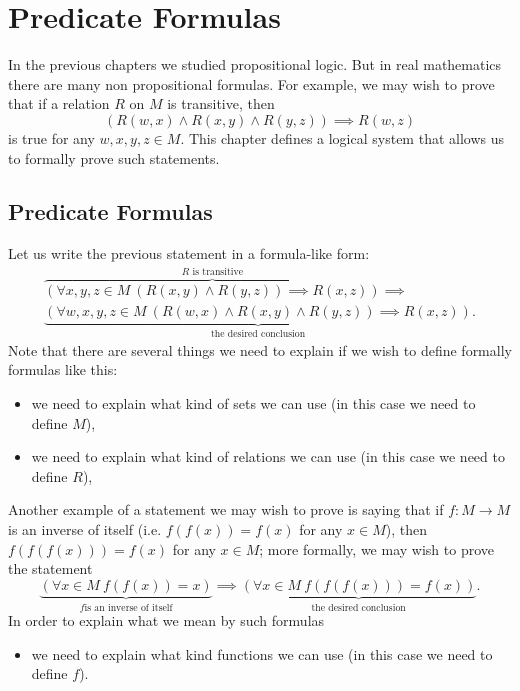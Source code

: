 \chapter{Predicate Formulas}
\label{chapter:predicate-formulas}
In the previous chapters we studied propositional logic. But in real mathematics
there are many non propositional formulas. For example, we may wish to prove
that if a relation $R$ on $M$ is transitive, then
\[
  (R(w, x) \land R(x, y) \land R(y, z)) \implies R(w, z)
\]
is true for any $w, x, y, z \in M$. This chapter defines a logical
system that allows us to formally prove such statements.

\section{Predicate Formulas}
Let us write the previous statement in a formula-like form:
\begin{multline*}
    \overbrace{
        \left(
          \forall x, y, z \in M ~ (R(x, y) \land R(y, z)) \implies R(x, z)
         \right)
    }^{R \text{ is transitive}} \implies \\
    \underbrace{(
        \forall w, x, y, z \in M ~ (R(w, x) \land R(x, y) \land R(y, z))
        \implies
        R(x, z)
    )}_\text{the desired conclusion}.
\end{multline*}
Note that there are several things we need to explain if we wish to define
formally formulas like this:
\begin{itemize}
    \item we need to explain what kind of sets we can use (in this case we need
        to define $M$),
    \item we need to explain what kind of relations we can use (in this case we
        need to define $R$),
\end{itemize}

Another example of a statement we may wish to prove is saying that if
$f : M \to M$ is an inverse of itself (i.e. $f(f(x)) = f(x)$ for any $x \in M$),
then $f(f(f(x))) = f(x)$ for any $x \in M$; more formally, we may wish to prove
the statement
\[
    \underbrace{
        (\forall x \in M ~ f(f(x)) = x)}_{f \text{is an inverse of itself}}
    \implies
    \underbrace{
        (\forall x \in M ~ f(f(f(x))) = f(x))
    }_\text{the desired conclusion}.
\]
In order to explain what we mean by such formulas
\begin{itemize}
  \item we need to explain what kind functions we can use (in this case we need
    to define $f$).
\end{itemize}

